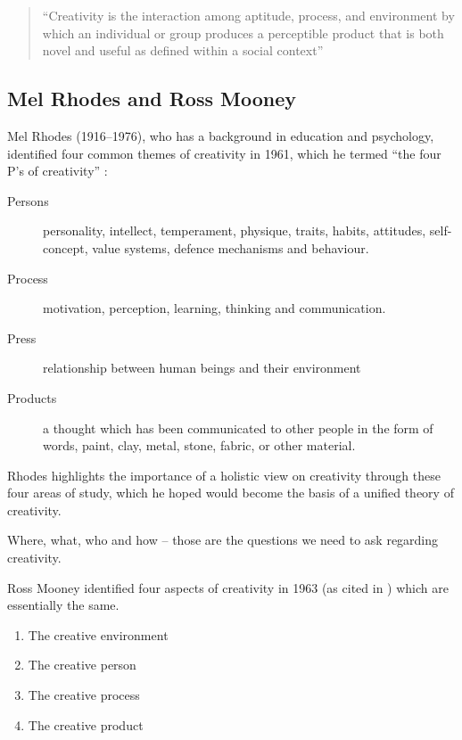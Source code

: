 \begin{quotation}
  ``Creativity is the interaction among aptitude, process, and environment by which an individual or group produces a perceptible product that is both novel and useful as defined within a social context'' 
\end{quotation}


\subsection*{Mel Rhodes and Ross Mooney}

Mel Rhodes (1916--1976), who has a background in education and psychology, identified four common themes of creativity in 1961, which he termed ``the four P’s of creativity'' \autocite{Rhodes1961}:

\begin{description}
  \item [Persons] personality, intellect, temperament, physique, traits, habits, attitudes, self-concept, value systems, defence mechanisms and behaviour.
  \item [Process] motivation, perception, learning, thinking and communication.
  \item [Press] relationship between human beings and their environment
  \item [Products] a thought which has been communicated to other people in the form of words, paint, clay, metal, stone, fabric, or other material.
\end{description}

Rhodes highlights the importance of a holistic view on creativity through these four areas of study, which he hoped would become the basis of a unified theory of creativity.

\begin{draft}
  Where, what, who and how – those are the questions we need to ask regarding creativity.
\end{draft}

Ross Mooney identified four aspects of creativity in 1963 (as cited in \autocite{Sternberg1999}) which are essentially the same.

\begin{enumerate}
  \item The creative environment
  \item The creative person
  \item The creative process
  \item The creative product
\end{enumerate}


